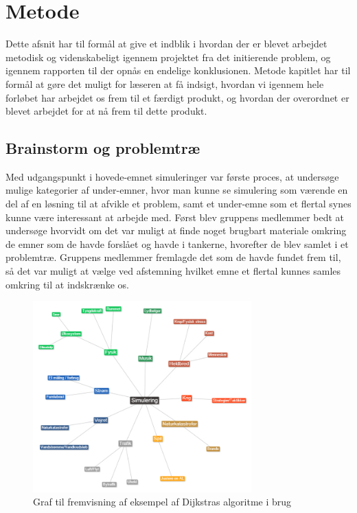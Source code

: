 \chapter{Metode}\label{Metode}

Dette afsnit har til formål at give et indblik i hvordan der er blevet arbejdet metodisk og videnskabeligt igennem projektet fra det initierende problem, og igennem rapporten til der opnås en endelige konklusionen. Metode kapitlet har til formål at gøre det muligt for læseren at få indsigt, hvordan vi igennem hele forløbet har arbejdet os frem til et færdigt produkt, og hvordan der overordnet er blevet arbejdet for at nå frem til dette produkt.

\section{Brainstorm og problemtræ}

Med udgangspunkt i hovede-emnet simuleringer var første proces, at undersøge mulige kategorier af under-emner, hvor man kunne se simulering som værende en del af en løsning til at afvikle et problem, samt et under-emne som et flertal synes kunne være interessant at arbejde med. Først blev gruppens medlemmer bedt at undersøge hvorvidt om det var muligt at finde noget brugbart materiale omkring de emner som de havde forslået og havde i tankerne, hvorefter de blev samlet i et problemtræ. Gruppens medlemmer fremlagde det som de havde fundet frem til, så det var muligt at vælge ved afstemning hvilket emne et flertal kunnes samles omkring til at indskrænke os.

\begin{figure}[H]
\begin{adjustbox}{width=0.75\textwidth,center=\textwidth}
\centering
\includegraphics[width=0.75\textwidth]{Pictures/Metode/Brainstorm.jpg}
\end{adjustbox}
\label{fig:dijkstrasgraf}
\caption{Graf til fremvisning af eksempel af Dijkstras algoritme i brug}
\end{figure}

